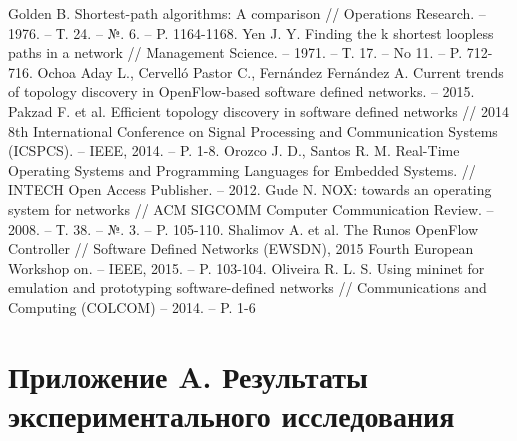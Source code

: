 \documentclass[12pt, a4paper]{article}
\begin{document}
\begin{thebibliography}{}
	Golden B. Shortest-path algorithms: A comparison // Operations Research. -- 1976. -- Т. 24. -- №. 6. -- P. 1164-1168.
	Yen J. Y. Finding the k shortest loopless paths in a network // Management Science. -- 1971. -- Т. 17. -- No 11. -- P. 712-716.
	Ochoa Aday L., Cervelló Pastor C., Fernández Fernández A. Current trends of topology discovery in OpenFlow-based software defined networks. -- 2015.
	Pakzad F. et al. Efficient topology discovery in software defined networks // 2014 8th International Conference on Signal Processing and Communication Systems (ICSPCS). -- IEEE, 2014. -- P. 1-8.
	Orozco J. D., Santos R. M. Real-Time Operating Systems and Programming Languages for Embedded Systems. // INTECH Open Access Publisher. -- 2012.
	Gude N. NOX: towards an operating system for networks // ACM SIGCOMM Computer Communication Review. -- 2008. -- Т. 38. -- №. 3. -- P. 105-110.
	Shalimov A. et al. The Runos OpenFlow Controller // Software Defined Networks (EWSDN), 2015 Fourth European Workshop on. -- IEEE, 2015. -- P. 103-104.
	Oliveira R. L. S. Using mininet for emulation and prototyping software-defined networks // Communications and Computing (COLCOM) -- 2014. -- P. 1-6
\end{thebibliography}


\section*{Приложение A. Результаты экспериментального исследования} \label{sec:results}
\end{document}
